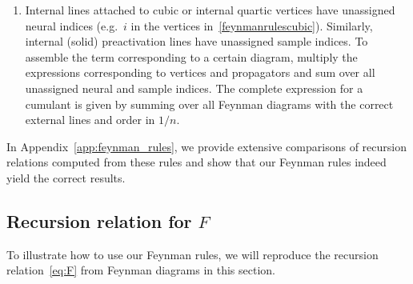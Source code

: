 \begin{enumerate}[label=(\roman*),leftmargin=*,widest=iii]
\begin{align}
    \label{feynmanrulesquartic}
  \end{align}
  The quartic vertices can also appear with four internal lines instead. In this case, they correspond to tensors in layer $\ell$ instead of $\ell+1$ and are connected to propagators. Further quartic tensors for the remaining tensors involving preactivations, the dNTK and ddNTK are introduced in Appendix~\ref{app:defin-all-tens}. For the mean NNGP and NTK corrections $K^{\{1\}}$ and $\Theta^{\{1\}}$, we similarly introduce \emph{quadratic vertices} of valence two.
\item Internal lines attached to cubic or internal quartic vertices have unassigned neural indices (e.g.\ $i$ in the vertices in~\eqref{feynmanrulescubic}). Similarly, internal (solid) preactivation lines have unassigned sample indices. To assemble the term corresponding to a certain diagram, multiply the expressions corresponding to vertices and propagators and sum over all unassigned neural and sample indices. The complete expression for a cumulant is given by summing over all Feynman diagrams with the correct external lines and order in $1/n$.
\end{enumerate}
In Appendix~\ref{app:feynman_rules}, we provide extensive comparisons of recursion relations computed from these rules and show that our Feynman rules indeed yield the correct results.

\subsection{Recursion relation for $F$}
To illustrate how to use our Feynman rules, we will reproduce the recursion relation~\eqref{eq:F} from Feynman diagrams in this section.

